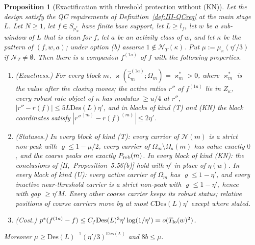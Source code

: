 \documentclass[10pt]{amsart}
\newtheorem{proposition}[theorem]{Proposition}
\theoremstyle{definition}
\theoremstyle{remark}
\begin{document}
\begin{proposition}[Exactification with threshold protection without (KN)]\label{prop:III-KNtr}
Let the design satisfy the QC requirements of
Definition~\textup{\ref{def:III-QCreq}} at the main stage $L$.  Let $N\ge1$, let
$f\in S_{p_N^*}$ have finite base support, let $L\ge l_f$, let $w$ be a
sub-window of $L$ that is clean for $f$, let $a$ be an activity class of $w$,
and let $\kappa$ be the pattern of $(f,w,a)$; under option \textup{(b)} assume
$1\notin\mathcal N_T(\kappa)$.  Put $\mu:=\mu_\kappa(\eta'/3)$ if $\mathcal N_T\ne
\emptyset$.  Then there is a companion $f^{(1a)}$ of $f$ with the following
properties.
\begin{enumerate}
\item[(a)] \textup{(Exactness.)}  For every block $m$, $\varkappa(\hat\zeta^{(1a)}_m;
\Omega_m)=\varkappa^*_m>0$, where $\varkappa^*_m$ is the value after the closing
moves; the active ratios $r''$ of $f^{(1a)}$ lie in $Z_\kappa$, every robust rate
object of $\kappa$ has modulus $\ge u/4$ at $r''$, $|r''-r(f)|\le5L\mathrm{Des}(L)\eta'$,
and in blocks of kind \textup{(T)} and \textup{(KN)} the block coordinates
satisfy $|r''^{(m)}-r(f)^{(m)}|\le2\eta'$.
\item[(b)] \textup{(Statuses.)}  In every block of kind \textup{(T)}: every
carrier of $\mathcal N(m)$ is a strict non-peak with $\varrho\le1-\mu/2$, every
carrier of $\Omega_m\setminus\Omega_a(m)$ has value exactly $0$, and the coarse
peaks are exactly $P_{\rm rob}(m)$.  In every block of kind \textup{(KN)}: the
conclusions of [II,~Proposition~5.56(b)] hold with $\eta'$ in place of
$\eta(w)$.  In every block of kind \textup{(U)}: every active carrier of
$\Omega_m$ has $\varrho\le1-\eta'$, and every inactive near-threshold carrier is
a strict non-peak with $\varrho\le1-\eta'$, hence with gap $\ge\eta'M$.  Every other coarse carrier keeps
its robust status; relative positions of coarse carriers move by at most
$C\mathrm{Des}(L)\eta'$ except where stated.
\item[(c)] \textup{(Cost.)}  $p^*(f^{(1a)}-f)\le C_f\mathrm{Des}(L)^3\eta'\log(1/\eta')
=o(T_{\rm lo}(w)^2)$.
\end{enumerate}
Moreover $\mu\ge\mathrm{Des}(L)^{-1}(\eta'/3)^{\mathrm{Des}(L)}$ and $8b\le\mu$.
\end{proposition}
\end{document}
